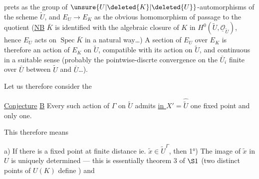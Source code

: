prets as the group  of $\unsure{U|\deleted{K}|\deleted{U}}$-automorphisms of the scheme $\widetilde U$, and $E_U\longrightarrow E_K$ as the obvious homomorphism of passage to the quotient (\uline{NB} $\bar K$ is identified with the algebraic closure of $K$ in $H^0(\widetilde U,\underline{\mathcal O}_{\widetilde U})$, hence $E_U$ acts on $\operatorname{Spec}\bar K$ in a natural way\ldots) A section of $E_U$ over $E_K$ is therefore an action of $E_K$ on $\widetilde U$, compatible with its action on $\widetilde U$, and continuous in a suitable sense (probably the pointwise-discrte convergence on the  $\bar U_i$ finite over $\bar U$ between $\widetilde U$ and $\bar U$\ldots).

Let us therefore consider the

\uline{Conjecture} \uline{B} Every such action of $\Gamma$ on $\widetilde U$ admits \uline{in $X'$}$=\widehat{\widetilde U}$ one fixed point and only one.

This therefore means

a) If there is a fixed point at finite distance ie. $\widetilde x\in\widetilde U^\Gamma$, then 1°) The image of $\widetilde x$ in $U$ is uniquely determined --- this is essentially theorem 3 of $\S1$ (two distinct points of $U(K)$ define ) and

